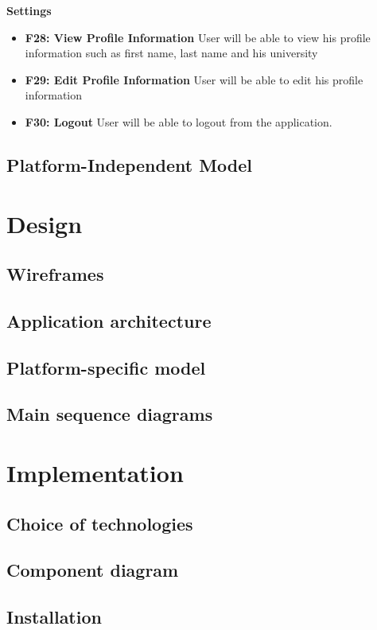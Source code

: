 \documentclass[thesis=B,english]{FITthesis}[2012/10/20]
\begin{document}
\bigskip
\textbf{Settings}
\begin{itemize}
	\item \textbf{F28: View Profile Information} User will be able to view his profile information such as first name, last name and his university
	\item \textbf{F29: Edit Profile Information} User will be able to edit his profile information
	\item \textbf{F30: Logout} User will be able to logout from the application.
\end{itemize}



\section{Platform-Independent Model}

\chapter{Design}
\section{Wireframes}
\section{Application architecture}
\section{Platform-specific model}
\section{Main sequence diagrams}

\chapter{Implementation}
\section{Choice of technologies}
\section{Component diagram}
\section{Installation}
\end{document}
